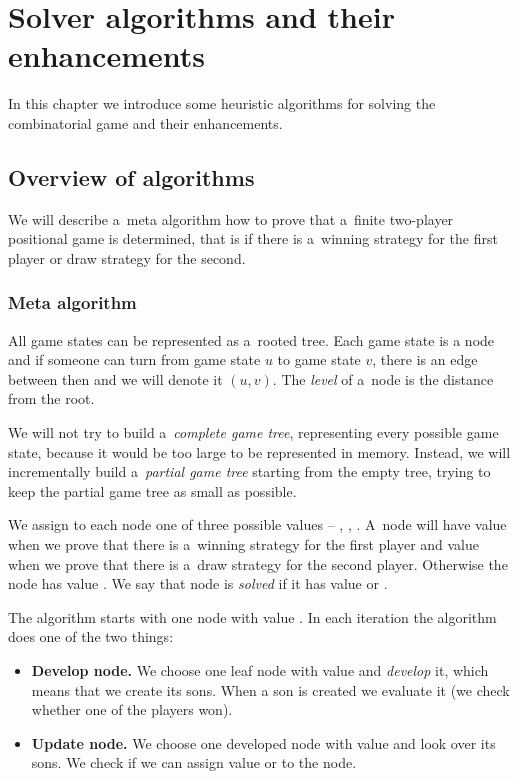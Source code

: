 \chapter{Solver algorithms and their enhancements}

In this chapter we introduce some heuristic algorithms for solving the
combinatorial game and their enhancements.

\section{Overview of algorithms}

We will describe a~meta algorithm how to prove that a~finite two-player
positional game is determined, that is if there is a~winning strategy for the first
player or draw strategy for the second.

\subsection{Meta algorithm}

All game states can be represented as a~rooted tree. Each game state is a
node and if someone can turn from game state $u$ to game state $v$, there is an
edge between then and we will denote it $(u,v)$. The \emph{level} of a~node
is the distance from the root. 

We will not try to build a~\emph{complete game tree}, representing every possible game
state, because it would be too large to be represented in memory. Instead, we
will incrementally build a~\emph{partial game tree} starting from the empty tree,
trying to keep the partial game tree as small as possible.

We assign to each node one of three possible values -- ,
, . A~node will have value  when we prove
that there is a~winning strategy for the first player and value 
when we prove that there is a~draw strategy for the second player. Otherwise
the node has value . We say that node is \emph{solved} if it has value
 or .

The algorithm starts with one node with value . In each iteration the
algorithm does one of the two things:

\begin{itemize} 
	\item \textbf{Develop node.} We choose one leaf node with value 
		and \emph{develop} it, which means that we create its sons. When 
		a son is created we evaluate it (we check whether one of the players
		won).
	\item \textbf{Update node.} We choose one developed node with value 
		and look over its sons. We check if we can assign value  
		or  to the node.
\end{itemize}

